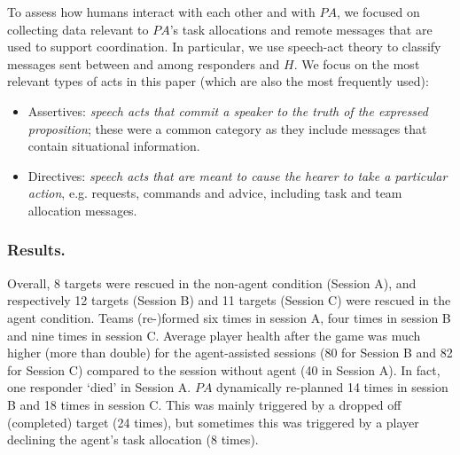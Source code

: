 To assess how humans interact with each other and with $PA$, we focused on collecting data relevant to $PA$'s task allocations and remote messages  that are used to support coordination. In particular, we use speech-act theory \cite{searle:1975} to classify messages sent between and among responders and $H$. We focus on the most relevant types of acts in this paper (which are also the most frequently used):
\begin{itemize}
\item Assertives: \textit{speech acts that commit a speaker to the truth of the expressed proposition}; these were a common category as they include messages that contain situational information.
\item Directives: \textit{speech acts that are meant to cause the hearer to take a particular action}, e.g. requests, commands and advice, including task and team allocation messages. 
\end{itemize}

\subsubsection{Results.}
\noindent Overall, 8 targets were rescued in the non-agent condition (Session A), and respectively 12 targets (Session B) and 11 targets (Session C) were rescued in the agent condition. Teams (re-)formed six times in session A, four times in session B and nine times  in session C. Average player health after the game was much higher (more than double) for the agent-assisted sessions (80 for Session B and 82 for Session C) compared to the session without agent (40 in Session A). In fact, one responder `died' in Session A.
$PA$ dynamically re-planned 14 times in session B and 18 times in session C. This was mainly triggered by a dropped off (completed) target (24 times), but sometimes this was triggered by a player declining the agent's task allocation (8 times). 


